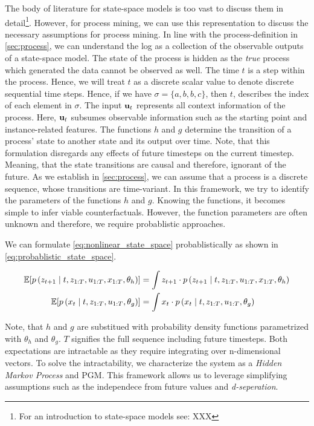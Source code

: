 \documentclass[./../../paper.tex]{subfiles}
\begin{document}
The body of literature for state-space models is too vast to discuss them in detail\footnote{For an introduction to state-space models see: XXX}. However, for process mining, we can use this representation to discuss the necessary assumptions for process mining.
In line with the process-definition in \autoref{sec:process}, we can understand the \gls{log} as a collection of the observable outputs of a state-space model. 
The state of the process is hidden as the \emph{true} process which generated the data cannot be observed as well. The time $t$ is a step within the process. Hence, we will treat $t$ as a discrete scalar value to denote discrete sequential time steps. Hence, if we have $\sigma=\{a,b,b,c\}$, then $t$, describes the index of each element in $\sigma$.  The input $\mathbf{u}_t$ represents all context information of the process. Here, $\mathbf{u}_t$ subsumes observable information such as the starting point and \gls{instance}-related features. The functions $h$ and $g$ determine the transition of a process' state to another state and its output over time. Note, that this formulation disregards any effects of future timesteps on the current timestep. Meaning, that the state transitions are causal and therefore, ignorant of the future.
As we establish in \autoref{sec:process}, we can assume that a process is a discrete sequence, whose transitions are time-variant. 
In this framework, we try to identify the parameters of the functions $h$ and $g$. Knowing the functions, it becomes simple to infer viable counterfactuals. However, the function parameters are often unknown and therefore, we require probablistic approaches.

We can formulate \autoref{eq:nonlinear_state_space} probablistically as shown in \autoref{eq:probablistic_state_space}.

\begin{align}
    \label{eq:probablistic_state_space}
    \mathbb{E}[p\left(z_{t+1} \mid t, z_{1:T}, u_{1:T}, x_{1:T}, \theta_h\right)] & =
    \int z_{t+1} \cdot p\left(z_{t+1} \mid t, z_{1:T}, u_{1:T}, x_{1:T}, \theta_h\right) \\
    \mathbb{E}[p\left(x_t \mid t, z_{1:T}, u_{1:T}, \theta_g\right)]   & =
    \int x_{t} \cdot p\left(x_t \mid t, z_{1:T}, u_{1:T}, \theta_g\right) \nonumber
\end{align}

Note, that $h$ and $g$ are substitued with probability density functions parametrized with $\theta_h$ and $\theta_g$. $T$ signifies the full sequence including future timesteps.
Both expectations are intractable as they require integrating over n-dimensional vectors. To solve the intractability, we characterize the system as a \emph{Hidden Markov Process} and \gls{PGM}. This framework allows us to leverage simplifying assumptions such as the independece from future values and \emph{d-seperation}. 
\end{document}
